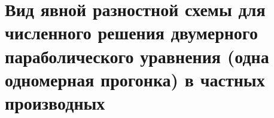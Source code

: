 \documentclass[__main__.tex]{subfiles}
\begin{document}
\section{Вид явной разностной схемы для численного решения двумерного параболического уравнения (одна одномерная прогонка) в частных производных}
\end{document}
